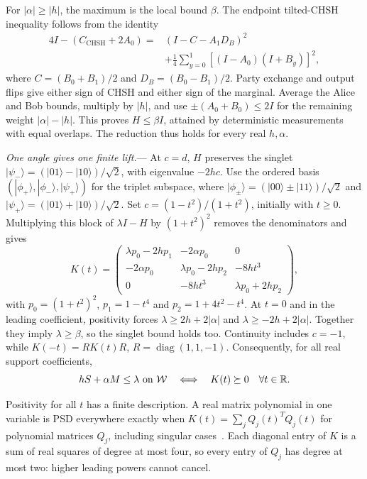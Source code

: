 \documentclass[aps,prl,reprint,superscriptaddress,nofootinbib,longbibliography]{revtex4-2}
\begin{document}
For $|\alpha|\ge|h|$, the maximum is the local bound $\beta$.
The endpoint tilted-CHSH inequality follows from the identity
\begin{equation}
\begin{split}
4I-(C_{\mathrm{CHSH}}+2A_0)
={}&(I-C-A_1D_B)^2\\
&+\tfrac14\sum_{y=0}^1[(I-A_0)(I+B_y)]^2,
\end{split}
 \label{eq:critical}
\end{equation}
where $C=(B_0+B_1)/2$ and $D_B=(B_0-B_1)/2$.
Party exchange and output flips give either sign of CHSH and
either sign of the marginal. Average the Alice and Bob bounds,
multiply by $|h|$, and use $\pm(A_0+B_0)\le2I$ for the remaining weight
$|\alpha|-|h|$. This proves $H\le\beta I$, attained by deterministic
measurements with equal overlaps. The reduction thus holds for every
real $h,\alpha$.

\emph{One angle gives one finite lift.}---
At $c=d$, $H$ preserves the singlet
$|\psi_-\rangle=(|01\rangle-|10\rangle)/\sqrt2$, with eigenvalue
$-2hc$. Use the ordered basis $(|\phi_+\rangle,|\phi_-\rangle,|\psi_+\rangle)$
for the triplet subspace, where
$|\phi_\pm\rangle=(|00\rangle\pm|11\rangle)/\sqrt2$ and
$|\psi_+\rangle=(|01\rangle+|10\rangle)/\sqrt2$. Set
$c=(1-t^2)/(1+t^2)$, initially with $t\ge0$. Multiplying this block
of $\lambda I-H$ by $(1+t^2)^2$ removes the denominators and gives
\begin{equation}
 K(t)=
 \begin{pmatrix}
 \lambda p_0-2hp_1&-2\alpha p_0&0\\
 -2\alpha p_0&\lambda p_0-2hp_2&-8ht^3\\
 0&-8ht^3&\lambda p_0+2hp_2
 \end{pmatrix},
 \label{eq:K}
\end{equation}
with $p_0=(1+t^2)^2$, $p_1=1-t^4$ and $p_2=1+4t^2-t^4$.
At $t=0$ and in the leading coefficient, positivity forces
$\lambda\ge2h+2|\alpha|$ and $\lambda\ge-2h+2|\alpha|$.
Together they imply $\lambda\ge\beta$, so the singlet bound holds too.
Continuity includes $c=-1$, while
$K(-t)=RK(t)R$, $R=\operatorname{diag}(1,1,-1)$.
Consequently, for all real support coefficients,
\begin{equation}
 hS+\alpha M\le\lambda\ \text{on }\mathcal W
 \quad\Longleftrightarrow\quad
 K(t)\succeq0\quad\forall t\in\mathbb R .
 \label{eq:equiv}
\end{equation}

Positivity for all $t$ has a finite description. A real matrix polynomial
in one variable is PSD everywhere exactly when
$K(t)=\sum_j Q_j(t)^TQ_j(t)$ for polynomial matrices $Q_j$, including
singular cases~\cite{HanselkaSinn}. Each diagonal entry of $K$ is a sum
of real squares of degree at most four, so every entry of $Q_j$ has degree
at most two: higher leading powers cannot cancel.
\end{document}

